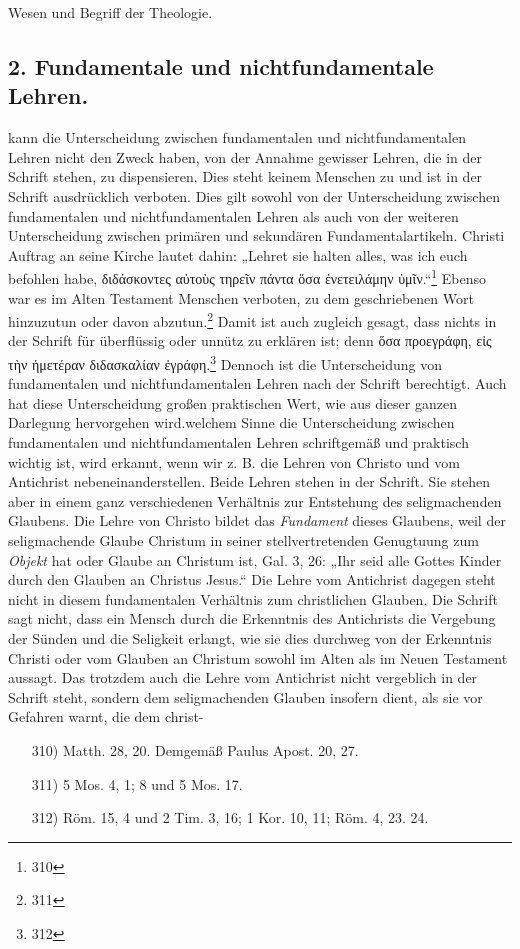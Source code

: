 \begingroup{} \par Wesen und Begriff der Theologie. \par\endgroup\n\n\subsection*{2. Fundamentale und nichtfundamentale Lehren.}\n{} kann die Unterscheidung zwischen fundamentalen und nichtfundamentalen Lehren nicht den Zweck haben, von der Annahme gewisser Lehren, die in der Schrift stehen, zu dispensieren. Dies steht keinem Menschen zu und ist in der Schrift ausdrücklich verboten. Dies gilt sowohl von der Unterscheidung zwischen fundamentalen und nichtfundamentalen Lehren als auch von der weiteren Unterscheidung zwischen primären und sekundären Fundamentalartikeln. Christi Auftrag an seine Kirche lautet dahin: „Lehret sie halten alles, was ich euch befohlen habe, \foreignlanguage{greek}{διδάσκοντες αὐτοὺς τηρεῖν πάντα ὅσα ἐνετειλάμην ὑμῖν.“}\footnote{310} Ebenso war es im Alten Testament Menschen verboten, zu dem geschriebenen Wort hinzuzutun oder davon abzutun.\footnote{311} Damit ist auch zugleich gesagt, dass nichts in der Schrift für überflüssig oder unnütz zu erklären ist; denn \foreignlanguage{greek}{ὅσα προεγράφη, εἰς τὴν ἡμετέραν διδασκαλίαν ἐγράφη.}\footnote{312} Dennoch ist die Unterscheidung von fundamentalen und nichtfundamentalen Lehren nach der Schrift berechtigt. Auch hat diese Unterscheidung großen praktischen Wert, wie aus dieser ganzen Darlegung hervorgehen wird.\n\nIn welchem Sinne die Unterscheidung zwischen fundamentalen und nichtfundamentalen Lehren schriftgemäß und praktisch wichtig ist, wird erkannt, wenn wir z. B. die Lehren von Christo und vom Antichrist nebeneinanderstellen. Beide Lehren stehen in der Schrift. Sie stehen aber in einem ganz verschiedenen Verhältnis zur Entstehung des seligmachenden Glaubens. Die Lehre von Christo bildet das \textit{Fundament} dieses Glaubens, weil der seligmachende Glaube Christum in seiner stellvertretenden Genugtuung zum \textit{Objekt} hat oder Glaube an Christum ist, Gal. 3, 26: „Ihr seid alle Gottes Kinder durch den Glauben an Christus Jesus.“ Die Lehre vom Antichrist dagegen steht nicht in diesem fundamentalen Verhältnis zum christlichen Glauben. Die Schrift sagt nicht, dass ein Mensch durch die Erkenntnis des Antichrists die Vergebung der Sünden und die Seligkeit erlangt, wie sie dies durchweg von der Erkenntnis Christi oder vom Glauben an Christum sowohl im Alten als im Neuen Testament aussagt. Das trotzdem auch die Lehre vom Antichrist nicht vergeblich in der Schrift steht, sondern dem seligmachenden Glauben insofern dient, als sie vor Gefahren warnt, die dem christ-\n\n\vspace{1.5em}\n\footnotesize\n\begin{enumerate}\n    \item[310)] Matth. 28, 20. Demgemäß Paulus Apost. 20, 27.\n    \item[311)] 5 Mos. 4, 1; 8 und 5 Mos. 17.\n    \item[312)] Röm. 15, 4 und 2 Tim. 3, 16; 1 Kor. 10, 11; Röm. 4, 23. 24.\n\end{enumerate}